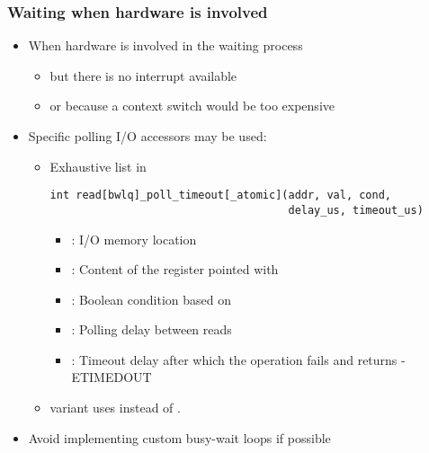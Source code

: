 \begin{frame}[fragile]
  \frametitle{Waiting when hardware is involved}
  \begin{itemize}
  \item When hardware is involved in the waiting process
    \begin{itemize}
    \item but there is no interrupt available
    \item or because a context switch would be too expensive
    \end{itemize}
  \item Specific polling I/O accessors may be used:
    \begin{itemize}
    \item Exhaustive list in 
      \begin{verbatim}
int read[bwlq]_poll_timeout[_atomic](addr, val, cond,
                                     delay_us, timeout_us)
      \end{verbatim}
        \begin{itemize}
        \item {}: I/O memory location
        \item {}: Content of the register pointed with
        \item {}: Boolean condition based on 
        \item {}: Polling delay between reads
        \item {}: Timeout delay after which the operation
          fails and returns -ETIMEDOUT
        \end{itemize}
        \item {} variant uses  instead of .
    \end{itemize}
  \item Avoid implementing custom busy-wait loops if possible
  \end{itemize}
\end{frame}
